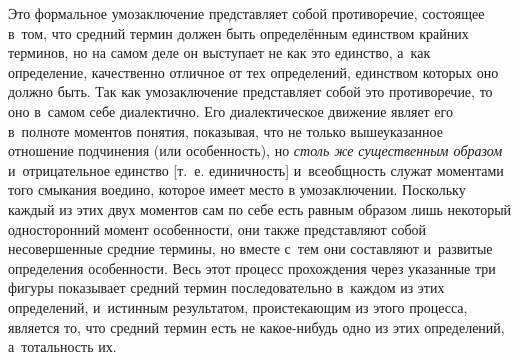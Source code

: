 Это формальное умозаключение представляет собой противоречие,
состоящее в~том, что средний термин должен быть определённым
единством крайних терминов, но на самом деле он выступает не
как это единство, а~как определение, качественно отличное от тех
определений, единством которых оно должно быть. Так как умозаключение
представляет собой это противоречие, то оно в~самом себе диалектично. Его
диалектическое движение являет его в~полноте моментов понятия, показывая,
что не только вышеуказанное отношение подчинения (или особенность), но
{\em столь же существенным образом}
и~отрицательное единство [т.~е. единичность] и~всеобщность
служат моментами того смыкания воедино, которое имеет место в
умозаключении. Поскольку каждый из этих двух моментов сам по себе есть
равным образом лишь некоторый односторонний момент особенности, они также
представляют собой несовершенные средние термины, но вместе с~тем они
составляют и~развитые определения особенности. Весь этот процесс
прохождения через указанные три фигуры показывает средний термин
последовательно в~каждом из этих определений, и~истинным результатом,
проистекающим из этого процесса, является то, что средний термин есть не
какое-нибудь одно из этих определений, а~тотальность их.

